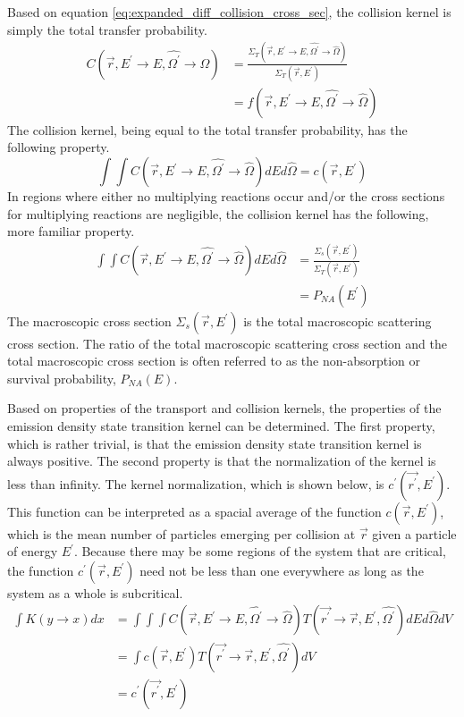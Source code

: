 Based on equation \ref{eq:expanded_diff_collision_cross_sec}, the collision 
kernel is simply the total transfer probability.  
\begin{align}
  C(\vec{r},E^{'} \to E, \hat{\Omega^{'}} \to \hat{\Omega}) & =
  \frac{\Sigma_T(\vec{r},E^{'} \to E,\hat{\Omega^{'}} \to \hat{\Omega})}
       {\Sigma_T(\vec{r},E^{'})} \nonumber \\
  & = f(\vec{r},E^{'} \to E,\hat{\Omega^{'}} \to \hat{\Omega})
\end{align}
The collision kernel, being equal to the total transfer probability, has the 
following property. 
\begin{equation}
  \int\int C(\vec{r},E^{'} \to E,\hat{\Omega^{'}} \to \hat{\Omega}) 
  dEd\hat{\Omega} = c(\vec{r},E^{'})
  \label{eq:collision_op_prop_gen}
\end{equation}
In regions where either no multiplying reactions occur and/or the cross sections
for multiplying reactions are negligible, the collision kernel has the 
following, more familiar property.
\begin{align}
  \int\int C(\vec{r},E^{'} \to E,\hat{\Omega^{'}} \to \hat{\Omega}) 
  dEd\hat{\Omega} & = \frac{\Sigma_s(\vec{r},E^{'})}{\Sigma_T(\vec{r},E^{'})}
  \label{eq:collision_op_prop} \\
  & = P_{NA}(E^{'}) \nonumber 
\end{align}
The macroscopic cross section $\Sigma_s(\vec{r},E^{'})$ is the total macroscopic
scattering cross section. The ratio of the total macroscopic scattering cross
section and the total macroscopic cross section is often referred to as the 
non-absorption or survival probability, $P_{NA}(E)$. 

Based on properties of the transport and collision kernels, the properties of 
the emission density state transition kernel can be determined. The first
property, which is rather trivial, is that the emission density state 
transition kernel is always positive. The second property is that the 
normalization of the kernel is less than infinity. The kernel normalization, 
which is shown below, is $c^{'}(\vec{r^{'}},E^{'})$. This function can be 
interpreted as a spacial average of the function $c(\vec{r},E^{'})$, which is 
the mean number of particles emerging per collision at $\vec{r}$ given a 
particle of energy $E^{'}$. Because there may be some regions of the system 
that are critical, the function $c^{'}(\vec{r},E^{'})$ need not be less than one 
everywhere as long as the system as a whole is subcritical.
\begin{align}
  \int K(y \to x) dx & = \int\int\int 
  C(\vec{r},E^{'} \to E,\hat{\Omega^{'}} \to \hat{\Omega})
  T(\vec{r^{'}} \to \vec{r},E^{'},\hat{\Omega^{'}}) dE d\hat{\Omega} dV 
  \nonumber \\
  & = \int c(\vec{r},E^{'}) T(\vec{r^{'}} \to \vec{r},E^{'},\hat{\Omega^{'}})
  dV \nonumber \\
  & = c^{'}(\vec{r^{'}},E^{'})
\end{align}

